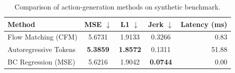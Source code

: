 \begin{table}[h]
\centering
\caption{Comparison of action-generation methods on synthetic benchmark.}
\label{tab:results}
\begin{tabular}{lcccr}
\toprule
Method & MSE $\downarrow$ & L1 $\downarrow$ & Jerk $\downarrow$ & Latency (ms) \\
\midrule
Flow Matching (CFM) & 5.6731 & 1.9133 & 0.3266 & 0.83 \\
Autoregressive Tokens & \textbf{5.3859} & \textbf{1.8572} & 0.1311 & 51.88 \\
BC Regression (MSE) & 5.6216 & 1.9042 & \textbf{0.0744} & 0.00 \\
\bottomrule
\end{tabular}
\end{table}